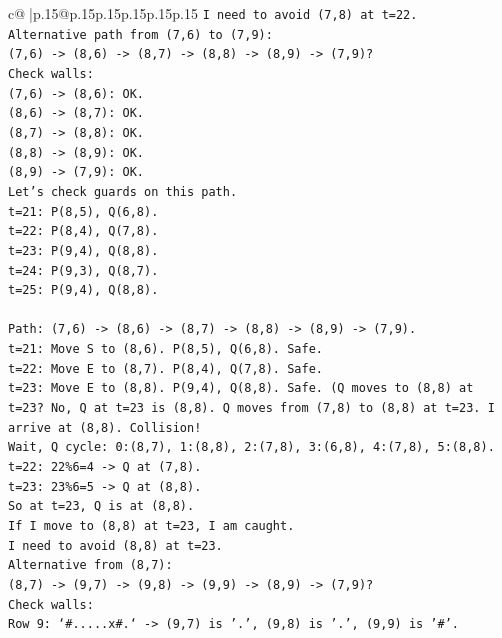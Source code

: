 \documentclass{article}
\begin{document}
{\begin{supertabular}{c@{$\;$}|p{.15\linewidth}@{}p{.15\linewidth}p{.15\linewidth}p{.15\linewidth}p{.15\linewidth}p{.15\linewidth}}
{{{\texttt{I need to avoid (7,8) at t=22.} \\
\texttt{Alternative path from (7,6) to (7,9):} \\
\texttt{(7,6) {-}> (8,6) {-}> (8,7) {-}> (8,8) {-}> (8,9) {-}> (7,9)?} \\
\texttt{Check walls:} \\
\texttt{(7,6) {-}> (8,6): OK.} \\
\texttt{(8,6) {-}> (8,7): OK.} \\
\texttt{(8,7) {-}> (8,8): OK.} \\
\texttt{(8,8) {-}> (8,9): OK.} \\
\texttt{(8,9) {-}> (7,9): OK.} \\
\texttt{Let's check guards on this path.} \\
\texttt{t=21: P(8,5), Q(6,8).} \\
\texttt{t=22: P(8,4), Q(7,8).} \\
\texttt{t=23: P(9,4), Q(8,8).} \\
\texttt{t=24: P(9,3), Q(8,7).} \\
\texttt{t=25: P(9,4), Q(8,8).} \\
\\ 
\texttt{Path: (7,6) {-}> (8,6) {-}> (8,7) {-}> (8,8) {-}> (8,9) {-}> (7,9).} \\
\texttt{t=21: Move S to (8,6). P(8,5), Q(6,8). Safe.} \\
\texttt{t=22: Move E to (8,7). P(8,4), Q(7,8). Safe.} \\
\texttt{t=23: Move E to (8,8). P(9,4), Q(8,8). Safe. (Q moves to (8,8) at t=23? No, Q at t=23 is (8,8). Q moves from (7,8) to (8,8) at t=23. I arrive at (8,8). Collision!} \\
\texttt{Wait, Q cycle: 0:(8,7), 1:(8,8), 2:(7,8), 3:(6,8), 4:(7,8), 5:(8,8).} \\
\texttt{t=22: 22\%6=4 {-}> Q at (7,8).} \\
\texttt{t=23: 23\%6=5 {-}> Q at (8,8).} \\
\texttt{So at t=23, Q is at (8,8).} \\
\texttt{If I move to (8,8) at t=23, I am caught.} \\
\texttt{I need to avoid (8,8) at t=23.} \\
\texttt{Alternative from (8,7):} \\
\texttt{(8,7) {-}> (9,7) {-}> (9,8) {-}> (9,9) {-}> (8,9) {-}> (7,9)?} \\
\texttt{Check walls:} \\
\texttt{Row 9: `\#.....x\#.` {-}> (9,7) is '.', (9,8) is '.', (9,9) is '\#'.} \\
}}}
\end{supertabular}}
\end{document}
